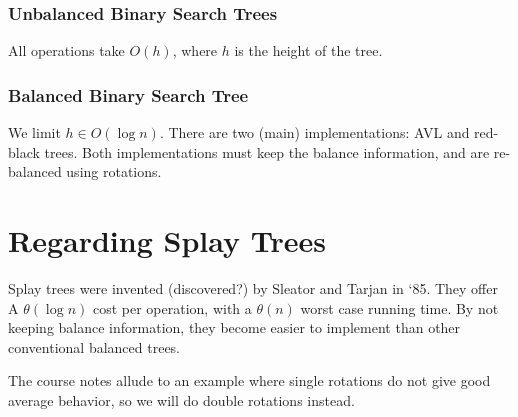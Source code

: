                     \subsubsection{Unbalanced Binary Search Trees} %
                    \label{ssub:unbalanced_binary_search_trees}
                        All operations take $O(h)$, where $h$ is the height of the tree.
                    \subsubsection{Balanced Binary Search Tree} %
                    \label{ssub:balanced_binary_search_tree}
                        We limit $h \in O(\log n)$.
                        There are two (main) implementations: AVL and red-black trees.
                        Both implementations must keep the balance information, and are re-balanced using rotations.
            \section{Regarding Splay Trees} %
            \label{sec:regarding_splay_trees}
                Splay trees were invented (discovered?) by Sleator and Tarjan in `85.
                They offer A $\theta(\log n)$ cost per operation, with a $\theta(n)$ worst case running time.
                By not keeping balance information, they become easier to implement than other conventional balanced trees.

                The course notes allude to an example where single rotations do not give good average behavior, so we will do double rotations instead.


